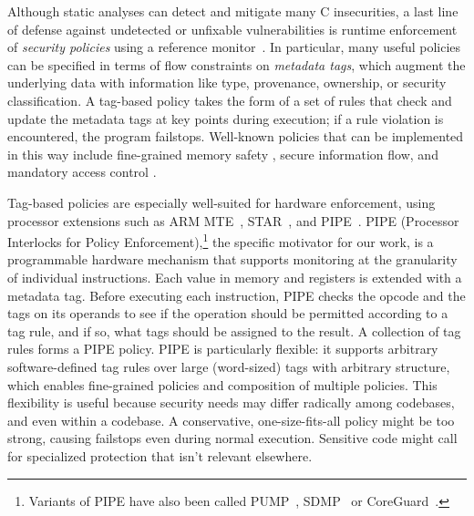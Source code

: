 \documentclass{llncs}
\begin{document}
Although static
analyses can detect and mitigate many C insecurities, a last line of
defense against undetected or unfixable vulnerabilities is runtime
enforcement of {\em security policies} using a reference
monitor~\cite{Anderson72:PlanningStudy}. In particular, 
many useful policies can be specified in terms of flow constraints on 
\emph{metadata tags}, which augment the underlying data with information like type, provenance,
ownership, or security classification. A tag-based policy takes the form of a set of
rules that check and update the metadata tags at key points during execution; if a rule violation is
encountered, the program failstops. Well-known policies that can be implemented
in this way include fine-grained memory safety \cite{Witchel02:MondrianMem}, secure information flow,
\cite{Denning76:SFIlattice} and mandatory access control \cite{USDoD85:OrangeBook}. 

Tag-based policies are especially well-suited for hardware enforcement, using 
processor extensions such as ARM MTE~\cite{arm-mte},
STAR~\cite{Gollapudi+23}, and
PIPE~\cite{Dhawan+15,Azevedo+16,Azevedo+15}.  PIPE (Processor
Interlocks for Policy Enforcement),\footnote{ Variants of PIPE have
also been called PUMP~\cite{Dhawan+14,Dhawan+15},
SDMP~\cite{Dover16,RoesslerD18} or CoreGuard~\cite{Dover20}.} 
the specific motivator for our work, 
is a programmable hardware mechanism that supports monitoring 
at the granularity of individual instructions. 
Each value in memory and registers
is extended with a metadata tag. Before executing each instruction,
PIPE checks the opcode and the tags on its operands to see if the operation 
should be permitted according to a tag rule, and if so, what tags should be 
assigned to the result. A collection of tag rules forms a PIPE policy.
PIPE is particularly flexible: it supports
arbitrary software-defined tag rules over large (word-sized) tags with arbitrary structure,
which enables fine-grained policies and composition of multiple policies. This flexibility 
is useful because security needs may differ radically among codebases,
and even within a codebase. A conservative, one-size-fits-all policy might be too strong,
causing failstops even during normal execution. Sensitive code might call for specialized
protection that isn't relevant elsewhere.
 
\end{document}
